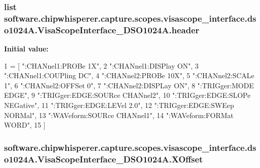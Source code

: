 \subsubsection[{header}]{\setlength{\rightskip}{0pt plus 5cm}list software.\+chipwhisperer.\+capture.\+scopes.\+visascope\+\_\+interface.\+dso1024\+A.\+Visa\+Scope\+Interface\+\_\+\+D\+S\+O1024\+A.\+header\hspace{0.3cm}{\ttfamily [static]}}\label{classsoftware_1_1chipwhisperer_1_1capture_1_1scopes_1_1visascope__interface_1_1dso1024A_1_1VisaScopeInterface__DSO1024A_ab3e59dadec242c852ed7894ba3f27b29}
{\bfseries Initial value\+:}
\begin{DoxyCode}
1 = [  \textcolor{stringliteral}{":CHANnel1:PROBe 1X"},
2                 \textcolor{stringliteral}{":CHANnel1:DISPlay ON"},
3                 \textcolor{stringliteral}{":CHANnel1:COUPling DC"},
4                 \textcolor{stringliteral}{":CHANnel2:PROBe 10X"},
5                 \textcolor{stringliteral}{":CHANnel2:SCALe 1"},
6                 \textcolor{stringliteral}{":CHANnel2:OFFSet 0"},
7                 \textcolor{stringliteral}{":CHANnel2:DISPLay ON"},
8                 \textcolor{stringliteral}{":TRIGger:MODE EDGE"},
9                 \textcolor{stringliteral}{":TRIGger:EDGE:SOURce CHANnel2"},
10                 \textcolor{stringliteral}{":TRIGger:EDGE:SLOPe NEGative"},
11                 \textcolor{stringliteral}{":TRIGger:EDGE:LEVel 2.0"},
12                 \textcolor{stringliteral}{":TRIGger:EDGE:SWEep NORMal"},
13                 \textcolor{stringliteral}{":WAVeform:SOURce CHANnel1"},
14                 \textcolor{stringliteral}{":WAVeform:FORMat WORD"},
15                 ]
\end{DoxyCode}
\hypertarget{classsoftware_1_1chipwhisperer_1_1capture_1_1scopes_1_1visascope__interface_1_1dso1024A_1_1VisaScopeInterface__DSO1024A_afe6d931718d6752110b987d9de5b1bfe}{}
\subsubsection[{X\+Offset}]{\setlength{\rightskip}{0pt plus 5cm}software.\+chipwhisperer.\+capture.\+scopes.\+visascope\+\_\+interface.\+dso1024\+A.\+Visa\+Scope\+Interface\+\_\+\+D\+S\+O1024\+A.\+X\+Offset}\label{classsoftware_1_1chipwhisperer_1_1capture_1_1scopes_1_1visascope__interface_1_1dso1024A_1_1VisaScopeInterface__DSO1024A_afe6d931718d6752110b987d9de5b1bfe}


